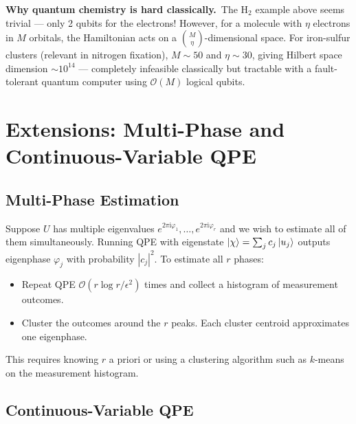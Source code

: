 \documentclass[12pt,a4paper]{article}
\newcommand{\QPE}{\textsc{QPE}}
\newcommand{\ii}{\mathrm{i}}
\newcommand{\bigO}{\mathcal{O}}
\begin{document}
\begin{tcolorbox}[insight]
  \textbf{Why quantum chemistry is hard classically.}\ The H$_2$ example
  above seems trivial — only 2 qubits for the electrons!  However, for a
  molecule with $\eta$ electrons in $M$ orbitals, the Hamiltonian
  acts on a $\binom{M}{\eta}$-dimensional space.  For iron-sulfur clusters
  (relevant in nitrogen fixation), $M \sim 50$ and $\eta \sim 30$,
  giving Hilbert space dimension $\sim 10^{14}$ — completely infeasible
  classically but tractable with a fault-tolerant quantum computer using
  $\bigO(M)$ logical qubits.
\end{tcolorbox}

\newpage

\section{Extensions: Multi-Phase and Continuous-Variable QPE}
\label{app:extensions}

\subsection{Multi-Phase Estimation}

Suppose $U$ has multiple eigenvalues $e^{2\pi\ii\varphi_1}, \ldots, e^{2\pi\ii\varphi_r}$
and we wish to estimate all of them simultaneously.  Running \QPE{} with
eigenstate $\Ket{\chi} = \sum_j c_j\Ket{u_j}$ outputs eigenphase $\varphi_j$
with probability $|c_j|^2$.  To estimate all $r$ phases:
\begin{itemize}[leftmargin=*]
  \item Repeat QPE $\bigO(r \log r / \epsilon^2)$ times and collect
        a histogram of measurement outcomes.
  \item Cluster the outcomes around the $r$ peaks.  Each cluster centroid
        approximates one eigenphase.
\end{itemize}
This requires knowing $r$ a priori or using a clustering algorithm such as
$k$-means on the measurement histogram.

\subsection{Continuous-Variable QPE}
\end{document}
